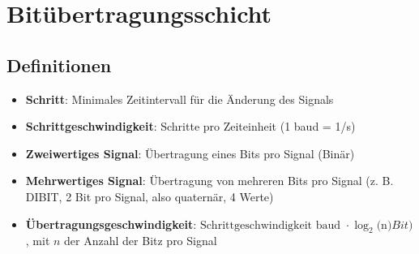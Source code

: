 \documentclass[a4paper,parskip=half*,DIV=15,fontsize=11pt]{scrartcl}
\begin{document}
\section{Bitübertragungsschicht}
\subsection{Definitionen}
\begin{itemize}
\item \textbf{Schritt}: Minimales Zeitintervall für die Änderung des Signals
\item \textbf{Schrittgeschwindigkeit}: Schritte pro Zeiteinheit (1 baud = 1/s)
\item \textbf{Zweiwertiges Signal}: Übertragung eines Bits pro Signal (Binär)
\item \textbf{Mehrwertiges Signal}: Übertragung von mehreren Bits pro Signal (z. B. DIBIT, 2 Bit pro Signal, also quaternär, 4 Werte)
\item \textbf{Übertragungsgeschwindigkeit}: $\textrm{Schrittgeschwindigkeit baud } \cdot \log_2($n$) Bit)$, mit $n$ der Anzahl der Bitz pro Signal
\end{itemize}
\end{document}
